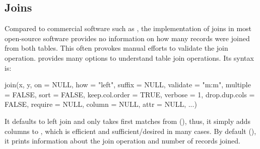 \documentclass[nojss]{jss} %
\newcommand{\fct}[1]{\code{#1()}}
\begin{document}
\subsection{Joins}
%
Compared to commercial software such as  \citep{STATA}, the implementation of joins in most open-source software provides no information on how many records were joined from both tables. This often provokes manual efforts to validate the join operation. \fct{collapse::join} provides many options to understand table join operations. Its syntax is:
\begin{Code}
join(x, y, on = NULL, how = "left", suffix = NULL, validate = "m:m",
  multiple = FALSE, sort = FALSE, keep.col.order = TRUE, verbose = 1,
  drop.dup.cols = FALSE, require = NULL, column = NULL, attr = NULL, ...)
\end{Code}
It defaults to left join and only takes first matches from  (), thus, it simply adds columns to , which is efficient and sufficient/desired in many cases. By default (), it prints information about the join operation and number of records joined. \newline
\end{document}
